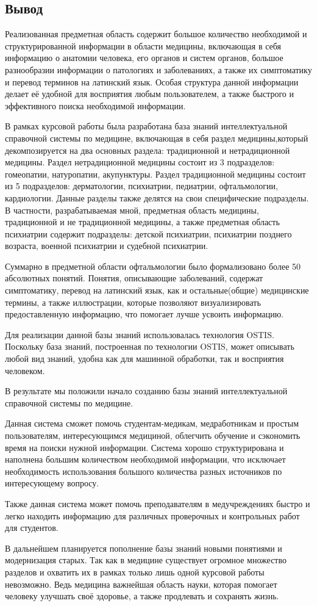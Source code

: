 \subsection{Вывод}
Реализованная предметная область содержит большое количество необходимой и структурированной информации в области медицины, включающая в себя информацию о анатомии человека, его органов и систем органов, большое разнообразии информации о патологиях и заболеваниях, а также их симптоматику и перевод терминов на латинский язык. Особая структура данной информации делает её удобной для восприятия любым пользователем, а также быстрого и эффективного поиска необходимой информации. 


В рамках курсовой работы была разработана база знаний интеллектуальной справочной системы по медицине, включающая в себя раздел медицины,который декомпозируется на два основных раздела: традиционной и нетрадиционной медицины. Раздел нетрадиционной медицины состоит из 3 подразделов: гомеопатии, натуропатии, акупунктуры.  Раздел традиционной медицины состоит из 5 подразделов: дерматологии, психиатрии, педиатрии, офтальмологии, кардиологии. Данные разделы также делятся на свои специфические подразделы. В частности, разрабатываемая мной, предметная область медицины, традиционной и не традиционной медицины, а также предметная область психиатрии содержит подразделы: детской психиатрии, психиатрии позднего возраста, военной психиатрии и судебной психиатрии.

Суммарно в предметной области офтальмологии было формализовано более 50 абсолютных понятий. Понятия, описывающие заболеваний, содержат симптоматику, перевод на латинский язык, как и остальные(общие) медицинские термины, а также иллюстрации, которые позволяют визуализировать предоставленную информацию, что помогает лучше усвоить информацию.

Для реализации данной базы знаний использовалась технология OSTIS. Поскольку база знаний, построенная по технологии OSTIS, может описывать любой вид знаний, удобна как для машинной обработки, так и восприятия человеком. 

В результате мы положили начало созданию базы знаний интеллектуальной справочной системы по медицине.

Данная система сможет помочь студентам-медикам, медработникам и простым пользователям, интересующимся медициной, облегчить обучение и сэкономить время на поиски нужной информации. Система хорошо структурирована и наполнена большим количеством необходимой информации, что исключает необходимость использования большого количества разных источников по интересующему вопросу.

Также данная система может помочь преподавателям в медучреждениях быстро и легко находить информацию для различных проверочных  и контрольных работ для студентов. 

В дальнейшем планируется пополнение базы знаний новыми понятиями и модернизация старых. Так как в медицине существует огромное множество разделов и охватить их в рамках только лишь одной курсовой работы невозможно. Ведь медицина важнейшая область науки, которая помогает человеку улучшать своё здоровье, а также продлевать и сохранять жизнь.